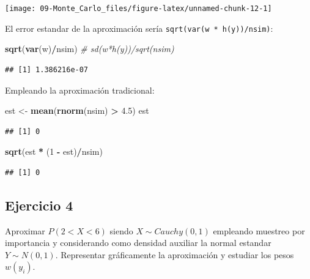 \documentclass[]{book}
\newenvironment{Shaded}{\begin{snugshade}}{\end{snugshade}}
\newcommand{\KeywordTok}[1]{\textcolor[rgb]{0.13,0.29,0.53}{\textbf{#1}}}
\newcommand{\DecValTok}[1]{\textcolor[rgb]{0.00,0.00,0.81}{#1}}
\newcommand{\FloatTok}[1]{\textcolor[rgb]{0.00,0.00,0.81}{#1}}
\newcommand{\StringTok}[1]{\textcolor[rgb]{0.31,0.60,0.02}{#1}}
\newcommand{\CommentTok}[1]{\textcolor[rgb]{0.56,0.35,0.01}{\textit{#1}}}
\newcommand{\OperatorTok}[1]{\textcolor[rgb]{0.81,0.36,0.00}{\textbf{#1}}}
\newcommand{\NormalTok}[1]{#1}
\theoremstyle{definition}
\theoremstyle{definition}
\theoremstyle{definition}
\theoremstyle{remark}
\begin{document}
\begin{center}\texttt{[image: 09-Monte\_Carlo\_files/figure-latex/unnamed-chunk-12-1]} \end{center}

El error estandar de la aproximación sería
\texttt{sqrt(var(w\ *\ h(y))/nsim)}:

\begin{Shaded}
\begin{Highlighting}[]
\KeywordTok{sqrt}\NormalTok{(}\KeywordTok{var}\NormalTok{(w)}\OperatorTok{/}\NormalTok{nsim) }\CommentTok{# sd(w*h(y))/sqrt(nsim)   }
\end{Highlighting}
\end{Shaded}

\begin{verbatim}
## [1] 1.386216e-07
\end{verbatim}

Empleando la aproximación tradicional:

\begin{Shaded}
\begin{Highlighting}[]
\NormalTok{est <-}\StringTok{ }\KeywordTok{mean}\NormalTok{(}\KeywordTok{rnorm}\NormalTok{(nsim) }\OperatorTok{>}\StringTok{ }\FloatTok{4.5}\NormalTok{)}
\NormalTok{est}
\end{Highlighting}
\end{Shaded}

\begin{verbatim}
## [1] 0
\end{verbatim}

\begin{Shaded}
\begin{Highlighting}[]
\KeywordTok{sqrt}\NormalTok{(est }\OperatorTok{*}\StringTok{ }\NormalTok{(}\DecValTok{1} \OperatorTok{-}\StringTok{ }\NormalTok{est)}\OperatorTok{/}\NormalTok{nsim)}
\end{Highlighting}
\end{Shaded}

\begin{verbatim}
## [1] 0
\end{verbatim}

\subsection{Ejercicio 4}\label{ejercicio-4}

Aproximar \(P\left(2<X<6\right)\) siendo \(X\sim Cauchy(0,1)\) empleando
muestreo por importancia y considerando como densidad auxiliar la normal
estandar \(Y\sim N(0,1)\). Representar gráficamente la aproximación y
estudiar los pesos \(w(y_i)\).
\end{document}
